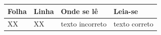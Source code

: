 
\begin{errata}

\begin{tabular}{|p{2cm}|p{2cm}|p{5cm}|p{5cm}|}
\hline
\textbf{Folha} & \textbf{Linha} & \textbf{Onde se lê} & \textbf{Leia-se} \\
\hline
XX & XX & texto incorreto & texto correto \\
\hline
\end{tabular}

\end{errata}
